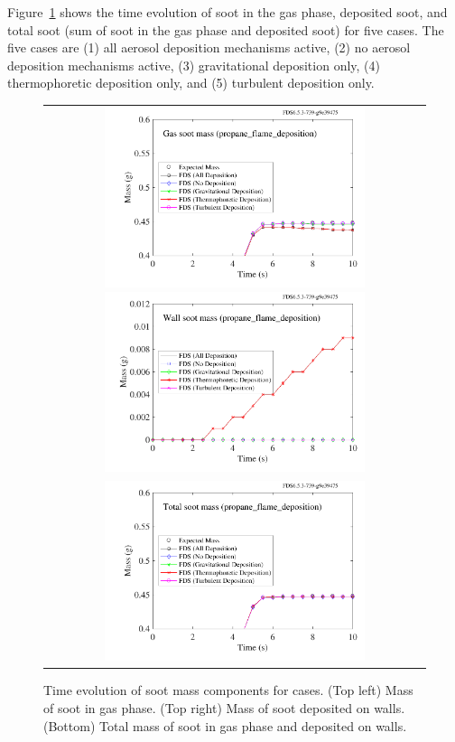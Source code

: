 \documentclass[11pt]{book}
\begin{document}
Figure~\ref{fig:deposition_mass} shows the time evolution of soot in the gas phase, deposited soot, and total soot (sum of soot in the gas phase and deposited soot) for five cases. The five cases are (1) all aerosol deposition mechanisms active, (2) no aerosol deposition mechanisms active, (3) gravitational deposition only, (4) thermophoretic deposition only, and (5) turbulent deposition only.

\begin{figure}[ht]
\begin{center}
\begin{tabular}{c}
\includegraphics[width=3.0in]{SCRIPT_FIGURES/propane_flame_deposition_gas}
\includegraphics[width=3.0in]{SCRIPT_FIGURES/propane_flame_deposition_wall} \\
\includegraphics[width=3.0in]{SCRIPT_FIGURES/propane_flame_deposition_total}
\end{tabular}
\end{center}
\caption[Soot mass conservation for  case]{Time evolution of soot mass components for  cases. (Top left) Mass of soot in gas phase. (Top right) Mass of soot deposited on walls. (Bottom) Total mass of soot in gas phase and deposited on walls.}
\label{fig:deposition_mass}
\end{figure}
\end{document}
